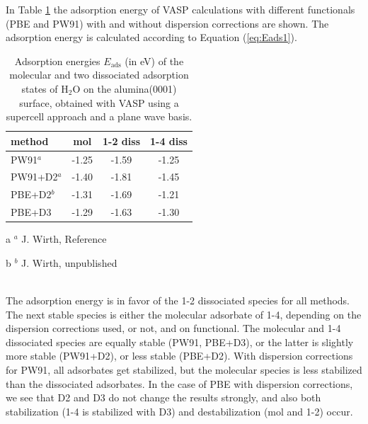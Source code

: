 \documentclass[11pt,DIV=13,BCOR=5mm,a4paper,headinclude]{scrbook}
\begin{document}
In Table \ref{tab:vasp-results} the adsorption energy of VASP calculations with different functionals (PBE and PW91) with and without dispersion corrections are shown.
The adsorption energy is calculated according to Equation (\ref{eq:Eads1}).
\begin{table}[!h]
  \centering
   \caption{Adsorption energies $E_\textrm{ads}$ (in eV) of the molecular and two dissociated adsorption states of H$_2$O on the alumina(0001) surface, obtained with VASP using a supercell approach and a plane wave basis.}
  \begin{tabular}{l|ccc}%
  \toprule
  method & mol & 1-2 diss & 1-4 diss\\\midrule %
  PW91$^a$   &-1.25 &-1.59 &-1.25 \\%
  PW91+D2$^a$&-1.40 &-1.81 &-1.45 \\%
  PBE+D2$^b$ & -1.31 & -1.69 & -1.21 \\
  PBE+D3 &-1.29&-1.63 &-1.30 \\\bottomrule%
  \end{tabular}
    \begin{tablenotes}
 \footnotesize
\item[a] $^a$ J. Wirth, Reference \cite{WirthJPCC2012,Wirth2014thesis}
\item[b] $^b$ J. Wirth, unpublished
\end{tablenotes}
  \label{tab:vasp-results}
 \end{table}
\\

The adsorption energy is in favor of the 1-2 dissociated species for all methods.
The next stable species is either the molecular adsorbate of 1-4, depending on the dispersion corrections used, or not, and on functional.
The molecular and 1-4 dissociated species are equally stable (PW91, PBE+D3), or the latter is slightly more stable (PW91+D2), or less stable (PBE+D2).
With dispersion corrections for PW91, all adsorbates get stabilized, but the molecular species is less stabilized than the dissociated adsorbates.
In the case of PBE with dispersion corrections, we see that D2 and D3 do not change the results strongly, and also both stabilization (1-4 is stabilized with D3) and destabilization (mol and 1-2) occur.
\end{document}
